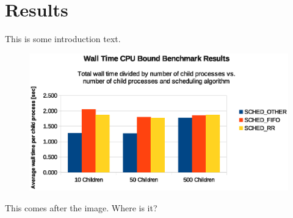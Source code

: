 ﻿\section{Results}

This is some introduction text.

\begin{figure}[H]
  \centering
  \includegraphics[scale=1.0]{img/cpu-wall-child.eps}
  \caption{}
  \label{cpu-wall-child}
\end{figure}

This comes after the image. Where is it?
